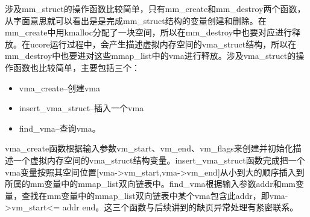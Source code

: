 涉及mm\_struct的操作函数比较简单，只有mm\_create和mm\_destroy两个函数，从字面意思就可以看出是是完成mm\_struct结构的变量创建和删除。在mm\_create中用kmalloc分配了一块空间，所以在mm\_destroy中也要对应进行释放。在ucore运行过程中，会产生描述虚拟内存空间的vma\_struct结构，所以在mm\_destroy中也要进对这些mmap\_list中的vma进行释放。涉及vma\_struct的操作函数也比较简单，主要包括三个：

\begin{itemize}
\item
  vma\_create--创建vma
\item
  insert\_vma\_struct--插入一个vma
\item
  find\_vma--查询vma。
\end{itemize}

vma\_create函数根据输入参数vm\_start、vm\_end、vm\_flags来创建并初始化描述一个虚拟内存空间的vma\_struct结构变量。insert\_vma\_struct函数完成把一个vma变量按照其空间位置{[}vma-\textgreater{}vm\_start,vma-\textgreater{}vm\_end{]}从小到大的顺序插入到所属的mm变量中的mmap\_list双向链表中。find\_vma根据输入参数addr和mm变量，查找在mm变量中的mmap\_list双向链表中某个vma包含此addr，即vma-\textgreater{}vm\_start\textless{}=
addr end。这三个函数与后续讲到的缺页异常处理有紧密联系。
